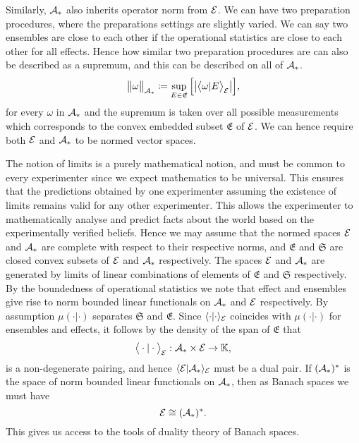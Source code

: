 \documentclass[11pt]{article}
\begin{document}
Similarly, $\mathcal{A}_* $ also inherits operator norm from $\mathcal{E}$. We can have two preparation procedures, where the preparations settings are slightly varied. We can say two ensembles are close to each other if the operational statistics are close to each other for all effects. Hence how similar two preparation procedures are can also be described as a supremum, and this can be described on all of $\mathcal{A}_* $. 
$$\big\| \omega \big\|_{\mathcal{A}_* }\coloneqq \sup_{E\in \mathfrak{E}}\Big[\big| \big\langle \omega|E\big\rangle_{\mathcal{E}}\big|\Big],$$
for every $\omega$ in $\mathcal{A}_*$ and the supremum is taken over all possible measurements which corresponds to the convex embedded subset $\mathfrak{E}$ of $\mathcal{E}$. We can hence require both $\mathcal{E}$ and $\mathcal{A}_* $ to be normed vector spaces.

The notion of limits is a purely mathematical notion, and must be common to every experimenter since we expect mathematics to be universal. This ensures that the predictions obtained by one experimenter assuming the existence of limits remains valid for any other experimenter. This allows the experimenter to mathematically analyse and predict facts about the world based on the experimentally verified beliefs. Hence we may assume that the normed spaces $\mathcal{E}$ and $\mathcal{A}_*$ are complete with respect to their respective norms, and $\mathfrak{E}$ and $\mathfrak{S}$ are closed convex subsets of $\mathcal{E}$ and $\mathcal{A}_*$ respectively. The spaces $\mathcal{E}$ and $\mathcal{A}_* $ are generated by limits of linear combinations of elements of $\mathfrak{E}$ and $\mathfrak{S}$ respectively. By the boundedness of operational statistics we note that effect and ensembles give rise to norm bounded linear functionals on $\mathcal{A}_* $ and $\mathcal{E}$ respectively. By assumption $\mu(\cdot|\cdot)$ separates $\mathfrak{S}$ and $\mathfrak{E}$. Since $\langle \cdot|\cdot\rangle_{\mathcal{E}}$ coincides with $\mu(\cdot|\cdot)$ for ensembles and effects, it follows by the density of the span of $\mathfrak{E}$ that
$$\big\langle \cdot|\cdot\big\rangle_{\mathcal{E}}: \mathcal{A}_*\times \mathcal{E} \to \mathbb{K},$$
is a non-degenerate pairing, and hence $\langle \mathcal{E}|\mathcal{A}_* \rangle_{\mathcal{E}}$ must be a dual pair. If $(\mathcal{A}_* )^*$ is the space of norm bounded linear functionals on $\mathcal{A}_* $, then as Banach spaces we must have
$$\mathcal{E}\cong(\mathcal{A}_*)^*.$$
This gives us access to the tools of duality theory of Banach spaces.
\end{document}

